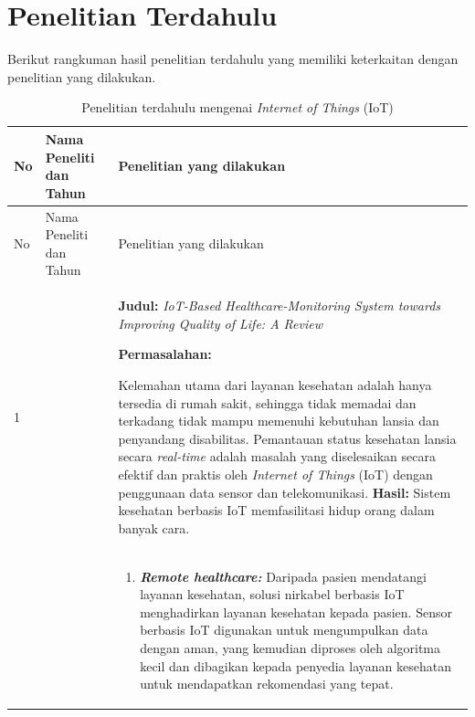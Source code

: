 \section{Penelitian Terdahulu}

Berikut rangkuman hasil penelitian terdahulu yang memiliki keterkaitan dengan penelitian yang dilakukan.

\begin{longtable}[!h]
    {
        p{}
        p{}
        p{}
    }
    \caption{Penelitian terdahulu mengenai \textit{Internet of Things} (IoT)}\\

    \hline
        No &
        Nama Peneliti dan Tahun &
        Penelitian yang dilakukan \\ [0.5ex]
    \hline

    \endfirsthead


    \hline
        No &
        Nama Peneliti dan Tahun &
        Penelitian yang dilakukan \\ [0.5ex]
    \hline
    \endhead %
    \hline

    \endfoot
    \hline
    \endlastfoot

        1
        & \textcite{inproc:abdulmalek}
        &
        \textbf{Judul:}
        \textit{IoT-Based Healthcare-Monitoring System towards Improving Quality of Life: A Review}

        \textbf{Permasalahan:}

        Kelemahan utama dari layanan kesehatan adalah hanya tersedia di rumah sakit, sehingga tidak memadai dan terkadang tidak mampu memenuhi kebutuhan lansia dan penyandang disabilitas. Pemantauan status kesehatan lansia secara \textit{real-time} adalah masalah yang diselesaikan secara efektif dan praktis oleh \textit{Internet of Things} (IoT) dengan penggunaan data sensor dan telekomunikasi.
        \textbf{Hasil:}
        Sistem kesehatan berbasis IoT memfasilitasi hidup orang dalam banyak cara.


        \\
        & &

        \begin{enumerate}
            \item \textbf{\textit{Remote healthcare:}}
            Daripada pasien mendatangi layanan kesehatan, solusi nirkabel berbasis IoT menghadirkan layanan kesehatan kepada pasien. Sensor berbasis IoT digunakan untuk mengumpulkan data dengan aman, yang kemudian diproses oleh algoritma kecil dan dibagikan kepada penyedia layanan kesehatan untuk mendapatkan rekomendasi yang tepat.


\end{enumerate}
\end{longtable}
